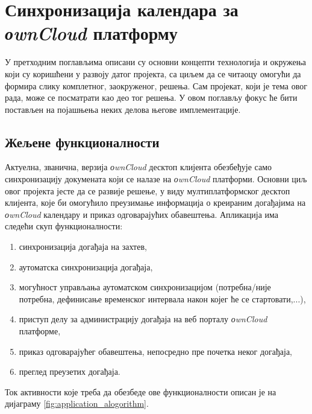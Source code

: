 \chapter{Синхронизација календара за \textit{оwnCloud} платформу}
\label{chap:ownCloudCalendarSynchronization}

У претходним поглављима описани су основни концепти технологија и окружења који су коришћени у развоју датог пројекта, са циљем да се читаоцу омогући да формира слику комплетног, заокруженог, решења. Сам пројекат, који је тема овог рада, може се посматрати као део тог решења. У овом поглављу фокус ће бити постављен на појашњења неких делова његове имплементације.

\section{Жељене функционалности}

Актуелна, званична, верзија \textit{оwnCloud} десктоп клијента обезбеђује само синхронизацију докумената који се налазе на \textit{оwnCloud} платформи. Основни циљ овог пројекта јесте да се развије решење, у виду мултиплатформског десктоп клијента, које би омогућило преузимање информација о креираним догађајима на \textit{оwnCloud} календару и приказ одговарајућих обавештења. Апликација има следећи скуп функционалности:
\begin{enumerate}
	\item синхронизација догађаја на захтев,
	\item аутоматска синхронизација догађаја,
	\item могућност управљања аутоматском синхронизацијом (потребна/није потребна, дефинисање временског интервала након којег ће се стартовати,...),
	\item приступ делу за администрацију догађаја на веб порталу \textit{оwnCloud} платформе,
	\item приказ одговарајућег обавештења, непосредно пре почетка неког догађаја,
	\item преглед преузетих догађаја.
\end{enumerate}

Ток активности које треба да обезбеде ове функционалности описан је на дијаграму \ref{fig:application_alogorithm}.

